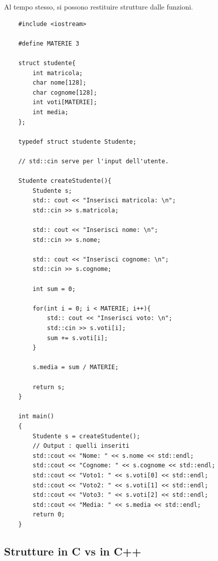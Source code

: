 \textsf{\small Al tempo stesso, si possono restituire strutture dalle funzioni.} \\

\begin{lstlisting}
	#include <iostream>
	
	#define MATERIE 3
	
	struct studente{
		int matricola;
		char nome[128];
		char cognome[128];
		int voti[MATERIE];
		int media;
	};

	typedef struct studente Studente;
	
	// std::cin serve per l'input dell'utente.

	Studente createStudente(){
		Studente s;
		std:: cout << "Inserisci matricola: \n";
		std::cin >> s.matricola;
		
		std:: cout << "Inserisci nome: \n";
		std::cin >> s.nome;
		
		std:: cout << "Inserisci cognome: \n";
		std::cin >> s.cognome;
		
		int sum = 0;
		
		for(int i = 0; i < MATERIE; i++){
			std:: cout << "Inserisci voto: \n";
			std::cin >> s.voti[i];
			sum += s.voti[i];
		}
	
		s.media = sum / MATERIE;
		
		return s;
	}

	int main()
	{
		Studente s = createStudente();
		// Output : quelli inseriti
		std::cout << "Nome: " << s.nome << std::endl;
		std::cout << "Cognome: " << s.cognome << std::endl;
		std::cout << "Voto1: " << s.voti[0] << std::endl;
		std::cout << "Voto2: " << s.voti[1] << std::endl;
		std::cout << "Voto3: " << s.voti[2] << std::endl;
		std::cout << "Media: " << s.media << std::endl;
		return 0;
	}
\end{lstlisting}

\subsection{Strutture in C vs in C++}

